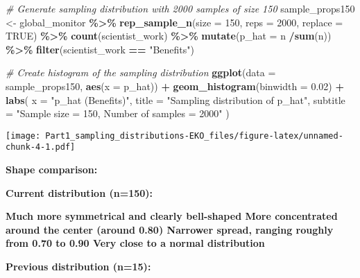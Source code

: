 \documentclass[
]{article}
\newenvironment{Shaded}{\begin{snugshade}}{\end{snugshade}}
\newcommand{\AttributeTok}[1]{\textcolor[rgb]{0.13,0.29,0.53}{#1}}
\newcommand{\CommentTok}[1]{\textcolor[rgb]{0.56,0.35,0.01}{\textit{#1}}}
\newcommand{\ConstantTok}[1]{\textcolor[rgb]{0.56,0.35,0.01}{#1}}
\newcommand{\DecValTok}[1]{\textcolor[rgb]{0.00,0.00,0.81}{#1}}
\newcommand{\FloatTok}[1]{\textcolor[rgb]{0.00,0.00,0.81}{#1}}
\newcommand{\FunctionTok}[1]{\textcolor[rgb]{0.13,0.29,0.53}{\textbf{#1}}}
\newcommand{\NormalTok}[1]{#1}
\newcommand{\OtherTok}[1]{\textcolor[rgb]{0.56,0.35,0.01}{#1}}
\newcommand{\SpecialCharTok}[1]{\textcolor[rgb]{0.81,0.36,0.00}{\textbf{#1}}}
\newcommand{\StringTok}[1]{\textcolor[rgb]{0.31,0.60,0.02}{#1}}
\begin{document}
\begin{Shaded}
\begin{Highlighting}[]
\CommentTok{\# Generate sampling distribution with 2000 samples of size 150}
\NormalTok{sample\_props150 }\OtherTok{\textless{}{-}}\NormalTok{ global\_monitor }\SpecialCharTok{\%\textgreater{}\%}
                    \FunctionTok{rep\_sample\_n}\NormalTok{(}\AttributeTok{size =} \DecValTok{150}\NormalTok{, }\AttributeTok{reps =} \DecValTok{2000}\NormalTok{, }\AttributeTok{replace =} \ConstantTok{TRUE}\NormalTok{) }\SpecialCharTok{\%\textgreater{}\%}
                    \FunctionTok{count}\NormalTok{(scientist\_work) }\SpecialCharTok{\%\textgreater{}\%}
                    \FunctionTok{mutate}\NormalTok{(}\AttributeTok{p\_hat =}\NormalTok{ n }\SpecialCharTok{/}\FunctionTok{sum}\NormalTok{(n)) }\SpecialCharTok{\%\textgreater{}\%}
                    \FunctionTok{filter}\NormalTok{(scientist\_work }\SpecialCharTok{==} \StringTok{"Benefits"}\NormalTok{)}
\end{Highlighting}
\end{Shaded}

\begin{Shaded}
\begin{Highlighting}[]
\CommentTok{\# Create histogram of the sampling distribution}
\FunctionTok{ggplot}\NormalTok{(}\AttributeTok{data =}\NormalTok{ sample\_props150, }\FunctionTok{aes}\NormalTok{(}\AttributeTok{x =}\NormalTok{ p\_hat)) }\SpecialCharTok{+}
  \FunctionTok{geom\_histogram}\NormalTok{(}\AttributeTok{binwidth =} \FloatTok{0.02}\NormalTok{) }\SpecialCharTok{+}
  \FunctionTok{labs}\NormalTok{(}
    \AttributeTok{x =} \StringTok{"p\_hat (Benefits)"}\NormalTok{,}
    \AttributeTok{title =} \StringTok{"Sampling distribution of p\_hat"}\NormalTok{,}
    \AttributeTok{subtitle =} \StringTok{"Sample size = 150, Number of samples = 2000"}
\NormalTok{  )}
\end{Highlighting}
\end{Shaded}

\texttt{[image: Part1\_sampling\_distributions-EKO\_files/figure-latex/unnamed-chunk-4-1.pdf]}

\textbf{Shape comparison:}

\textbf{Current distribution (n=150):}

\textbf{Much more symmetrical and clearly bell-shaped More concentrated
around the center (around 0.80) Narrower spread, ranging roughly from
0.70 to 0.90 Very close to a normal distribution}

\textbf{Previous distribution (n=15):}
\end{document}
